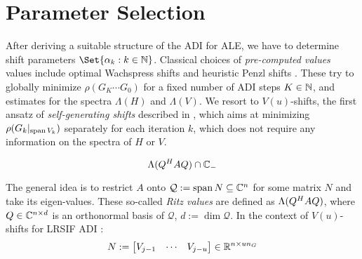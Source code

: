 \section{Parameter Selection}
\label{sec:adi:parameters}

After deriving a suitable structure of the \ac{ADI} for \ac{ALE},
we have to determine shift parameters $\Set{\alpha_k : k\in\N}$.
Classical choices of \emph{pre-computed values} values include
optimal Wachspress shifts \cite{Wachspress1992,Wachspress2013} and
heuristic Penzl shifts \cite{Penzl1999}.
These try to globally minimize $\rho(G_K \cdots G_0)$ for a fixed number of \ac{ADI} steps $K\in\mathbb{N}$,
and estimates for the spectra $\Lambda(H)$ and $\Lambda(V)$.
We resort to $V(u)$-shifts, the first ansatz of \emph{self-generating shifts} described in \cite[Section~5.3]{Kuerschner2016},
which aims at minimizing
$\rho(G_k |_{\operatorname{span} V_k})$
separately for each iteration $k$,
which does not require any information on the spectra of $H$ or $V$.


\begin{equation*}
  \Lambda(Q^H A Q) \cap \mathbb{C}_-
\end{equation*}

The general idea is to restrict $A$ onto
$\mathcal Q := \operatorname{span} N \subseteq \mathbb{C}^n$
for some matrix $N$ and take its eigen-values.
These so-called \emph{Ritz values} are defined as $\Lambda(Q^H A Q)$,
where $Q\in\mathbb{C}^{n\times d}$ is an orthonormal basis of $\mathcal Q$, $d := \dim\mathcal Q$.
In the context of $V(u)$-shifts for \ac{LRSIF} \ac{ADI} \cite{Lang2015}:
\begin{equation}
  N := \begin{bmatrix}
    V_{j-1} &
    \cdots &
    V_{j-u}
  \end{bmatrix}
  \in \mathbb{R}^{n\times u n_G}
\end{equation}


